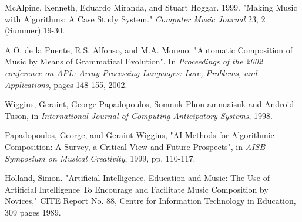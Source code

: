 \documentclass{chi2009}
\begin{document}
\begin{thebibliography}{9}
McAlpine, Kenneth, Eduardo Miranda, and Stuart Hoggar.  1999.  "Making Music with Algorithms: A Case Study System." \textit{Computer Music Journal} 23, 2 (Summer):19-30.

A.O. de la Puente, R.S. Alfonso, and M.A. Moreno.  "Automatic Composition of Music by Means of Grammatical Evolution".  In \textit{Proceedings of the 2002 conference on APL: Array Processing Languages: Lore, Problems, and Applications}, pages 148-155, 2002.

Wiggins, Geraint, George Papadopoulos, Somnuk Phon-amnuaisuk and Android Tuson, in \textit{International Journal of Computing Anticipatory Systems}, 1998.

Papadopoulos, George, and Geraint Wiggins, "AI Methods for Algorithmic Composition: A Survey, a Critical View and Future Prospects", in \textit{AISB Symposium on Musical Creativity}, 1999, pp. 110-117.

Holland, Simon. "Artificial Intelligence, Education and Music: The Use of Artificial Intelligence To Encourage and Facilitate Music Composition by Novices," CITE Report No. 88, Centre for Information Technology in Education, 309 pages 1989.
 

\end{thebibliography}
\end{document}
